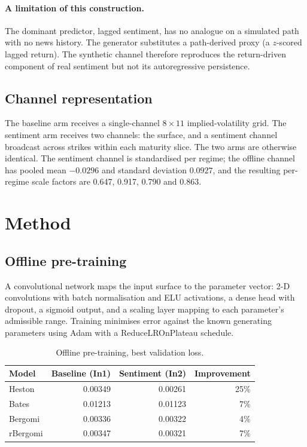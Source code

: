 \documentclass[11pt,a4paper]{article}
\begin{document}
\paragraph{A limitation of this construction.} The dominant predictor, lagged
sentiment, has no analogue on a simulated path with no news history. The
generator substitutes a path-derived proxy (a $z$-scored lagged return). The
synthetic channel therefore reproduces the return-driven component of real
sentiment but not its autoregressive persistence.

\subsection{Channel representation}
The baseline arm receives a single-channel $8\times11$ implied-volatility grid.
The sentiment arm receives two channels: the surface, and a sentiment channel
broadcast across strikes within each maturity slice. The two arms are otherwise
identical. The sentiment channel is standardised per regime; the offline channel
has pooled mean $-0.0296$ and standard deviation $0.0927$, and the resulting
per-regime scale factors are 0.647, 0.917, 0.790 and 0.863.

\section{Method}

\subsection{Offline pre-training}
A convolutional network maps the input surface to the parameter vector: 2-D
convolutions with batch normalisation and ELU activations, a dense head with
dropout, a sigmoid output, and a scaling layer mapping to each parameter's
admissible range. Training minimises error against the known generating
parameters using Adam with a ReduceLROnPlateau schedule.

\begin{table}[h]
\centering
\caption{Offline pre-training, best validation loss.}
\label{tab:offline}
\begin{tabular}{lrrr}
\toprule
Model & Baseline (In1) & Sentiment (In2) & Improvement \\
\midrule
Heston   & 0.00349 & 0.00261 & 25\% \\
Bates    & 0.01213 & 0.01123 & 7\% \\
Bergomi  & 0.00336 & 0.00322 & 4\% \\
rBergomi & 0.00347 & 0.00321 & 7\% \\
\bottomrule
\end{tabular}
\end{table}
\end{document}
